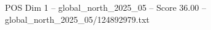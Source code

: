 \begin{textsample}{POS Dim 1 – global\_north\_2025\_05 – Score 36.00 – global\_north\_2025\_05/124892979.txt}
\end{textsample}
